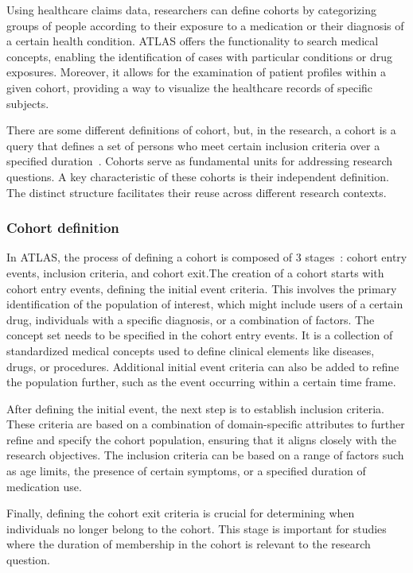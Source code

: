 Using healthcare claims data, researchers can define cohorts by categorizing groups of people according to their exposure to a medication or their diagnosis of a certain health condition. ATLAS offers the functionality to search medical concepts, enabling the identification of cases with particular conditions or drug exposures. Moreover, it allows for the examination of patient profiles within a given cohort, providing a way to visualize the healthcare records of specific subjects.

There are some different definitions of cohort, but, in the {\ohdsi} research, a cohort is a query that defines a set of persons who meet certain inclusion criteria over a specified duration~\cite{informatics_chapter_nodate}. Cohorts serve as fundamental units for addressing research questions. A key characteristic of these cohorts is their independent definition. The distinct structure facilitates their reuse across different research contexts.


\subsubsection{Cohort definition}

In ATLAS, the process of defining a cohort is composed of 3 stages~\cite{informatics_chapter_nodate}: cohort entry events, inclusion criteria, and cohort exit.The creation of a cohort starts with cohort entry events, defining the initial event criteria. This involves the primary identification of the population of interest, which might include users of a certain drug, individuals with a specific diagnosis, or a combination of factors. The concept set needs to be specified in the cohort entry events. It is a collection of standardized medical concepts used to define clinical elements like diseases, drugs, or procedures. Additional initial event criteria can also be added to refine the population further, such as the event occurring within a certain time frame.

After defining the initial event, the next step is to establish inclusion criteria. These criteria are based on a combination of domain-specific attributes to further refine and specify the cohort population, ensuring that it aligns closely with the research objectives. The inclusion criteria can be based on a range of factors such as age limits, the presence of certain symptoms, or a specified duration of medication use.

Finally, defining the cohort exit criteria is crucial for determining when individuals no longer belong to the cohort. This stage is important for studies where the duration of membership in the cohort is relevant to the research question.

